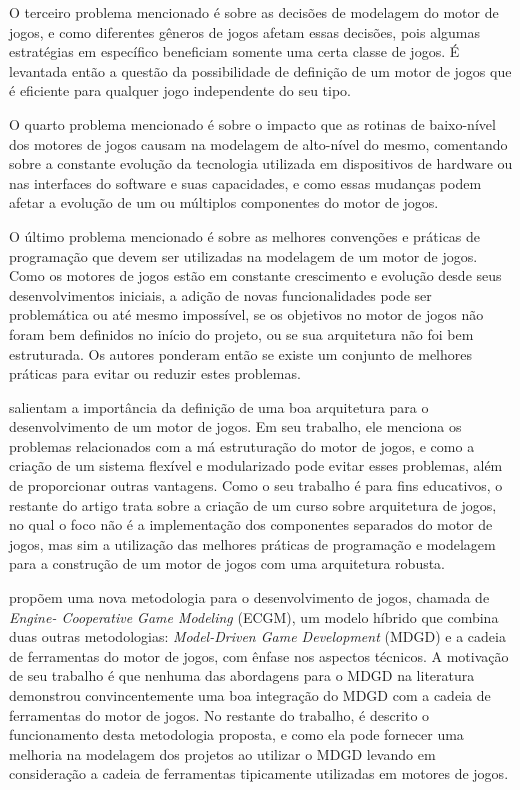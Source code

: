 O terceiro problema mencionado é sobre as decisões de modelagem do motor de jogos, e 
como diferentes gêneros de jogos afetam essas decisões, pois algumas estratégias em 
específico beneficiam somente uma certa classe de jogos. É levantada então a 
questão da possibilidade de definição de um motor de jogos que é eficiente para qualquer 
jogo independente do seu tipo.

O quarto problema mencionado é sobre o impacto que as rotinas de baixo-nível dos motores 
de jogos causam na modelagem de alto-nível do mesmo, comentando sobre a constante 
evolução da tecnologia utilizada em dispositivos de hardware ou nas interfaces do 
software e suas capacidades, e como essas mudanças podem afetar a evolução de um ou 
múltiplos componentes do motor de jogos.

O último problema mencionado é sobre as melhores convenções e práticas de programação 
que devem ser utilizadas na modelagem de um motor de jogos. Como os motores de jogos 
estão em constante crescimento e evolução desde seus desenvolvimentos iniciais, a 
adição de novas funcionalidades pode ser problemática ou até mesmo impossível, se os 
objetivos no motor de jogos não foram bem definidos no início do projeto, ou se sua 
arquitetura não foi bem estruturada. Os autores ponderam então se existe um conjunto de 
melhores práticas para evitar ou reduzir estes problemas.

 salientam a importância da definição de uma boa arquitetura para 
o desenvolvimento de um motor de jogos. Em seu trabalho, ele menciona os problemas 
relacionados com a má estruturação do motor de jogos, e como a criação de um sistema 
flexível e modularizado pode evitar esses problemas, além de proporcionar outras 
vantagens.
Como o seu trabalho é para fins educativos, o restante do artigo trata sobre a 
criação de um curso sobre arquitetura de jogos, no qual o foco não é a implementação dos 
componentes separados do motor de jogos, mas sim a utilização das melhores práticas de 
programação e modelagem para a construção de um motor de jogos com uma arquitetura 
robusta.

 propõem uma nova metodologia para o desenvolvimento de jogos, 
chamada de \textit{Engine- Cooperative Game Modeling} (ECGM), um modelo híbrido 
que combina duas outras metodologias: \textit{Model-Driven Game Development} (MDGD) e a 
cadeia de ferramentas do motor de jogos, com ênfase nos aspectos técnicos. A motivação 
de seu trabalho é que nenhuma das abordagens para o MDGD na literatura demonstrou 
convincentemente uma boa integração do MDGD com a cadeia de ferramentas do motor de 
jogos.
No restante do trabalho, é descrito o funcionamento desta metodologia proposta, e como 
ela pode fornecer uma melhoria na modelagem dos projetos ao utilizar o MDGD levando em 
consideração a cadeia de ferramentas tipicamente utilizadas em motores de jogos.


